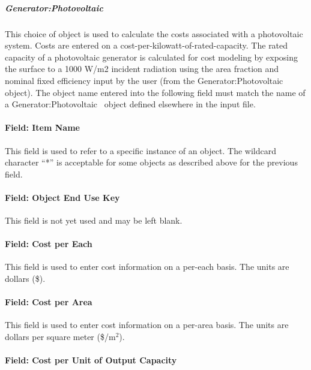 \subparagraph{Generator:Photovoltaic}\label{generatorphotovoltaic}

This choice of object is used to calculate the costs associated with a photovoltaic system. Costs are entered on a cost-per-kilowatt-of-rated-capacity. The rated capacity of a photovoltaic generator is calculated for cost modeling by exposing the surface to a 1000 W/m2 incident radiation using the area fraction and nominal fixed efficiency input by the user (from the Generator:Photovoltaic object). The object name entered into the following field must match the name of a Generator:Photovoltaic ~object defined elsewhere in the input file.

\paragraph{Field: Item Name}\label{field-item-name}

This field is used to refer to a specific instance of an object. The wildcard character ``*'' is acceptable for some objects as described above for the previous field.

\paragraph{Field: Object End Use Key}\label{field-object-end-use-key}

This field is not yet used and may be left blank.

\paragraph{Field: Cost per Each}\label{field-cost-per-each}

This field is used to enter cost information on a per-each basis. The units are dollars (\$).

\paragraph{Field: Cost per Area}\label{field-cost-per-area}

This field is used to enter cost information on a per-area basis. The units are dollars per square meter (\$/m\(^{2}\)).

\paragraph{Field: Cost per Unit of Output Capacity}\label{field-cost-per-unit-of-output-capacity}

